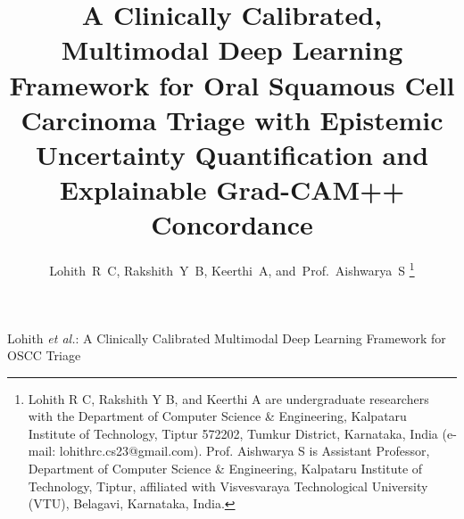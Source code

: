 \documentclass[journal]{IEEEtran}
\begin{document}
\title{A Clinically Calibrated, Multimodal Deep Learning Framework for Oral Squamous Cell Carcinoma Triage with Epistemic Uncertainty Quantification and Explainable Grad-CAM++ Concordance}

\author{Lohith~R~C,
        Rakshith~Y~B,
        Keerthi~A,
        and~Prof.~Aishwarya~S%
\thanks{Lohith R C, Rakshith Y B, and Keerthi A are undergraduate researchers with the Department of Computer Science \& Engineering, Kalpataru Institute of Technology, Tiptur 572202, Tumkur District, Karnataka, India (e-mail: lohithrc.cs23@gmail.com). Prof. Aishwarya S is Assistant Professor, Department of Computer Science \& Engineering, Kalpataru Institute of Technology, Tiptur, affiliated with Visvesvaraya Technological University (VTU), Belagavi, Karnataka, India.}}

%
{Lohith \MakeLowercase{\textit{et al.}}: A Clinically Calibrated Multimodal Deep Learning Framework for OSCC Triage}

\maketitle
\end{document}
